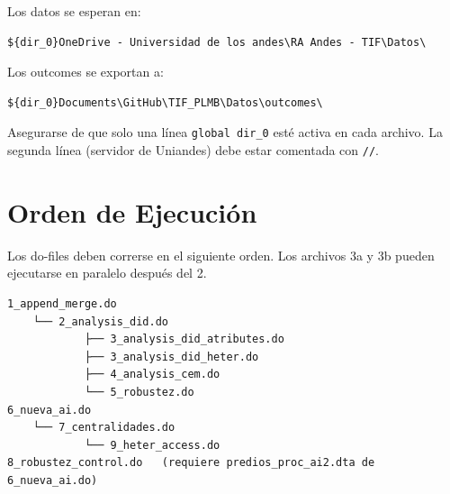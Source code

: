 \documentclass[12pt, a4paper]{article}
\begin{document}
Los datos se esperan en:
\begin{lstlisting}[language={}]
${dir_0}OneDrive - Universidad de los andes\RA Andes - TIF\Datos\
\end{lstlisting}

Los outcomes se exportan a:
\begin{lstlisting}[language={}]
${dir_0}Documents\GitHub\TIF_PLMB\Datos\outcomes\
\end{lstlisting}

\begin{notebox}
Asegurarse de que solo una línea \texttt{global dir\_0} esté activa en cada archivo. La segunda línea (servidor de Uniandes) debe estar comentada con \texttt{//}.
\end{notebox}

\section{Orden de Ejecución}

Los do-files deben correrse en el siguiente orden. Los archivos 3a y 3b pueden ejecutarse en paralelo después del 2.

\begin{lstlisting}[language={}]
1_append_merge.do
    └── 2_analysis_did.do
            ├── 3_analysis_did_atributes.do
            ├── 3_analysis_did_heter.do
            ├── 4_analysis_cem.do
            └── 5_robustez.do
6_nueva_ai.do
    └── 7_centralidades.do
            └── 9_heter_access.do
8_robustez_control.do   (requiere predios_proc_ai2.dta de 6_nueva_ai.do)
\end{lstlisting}
\end{document}
